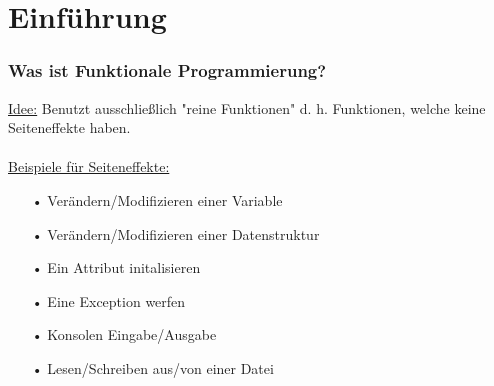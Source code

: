 	\section[Section]{Einführung}
		\begin{frame}
			\frametitle{Was ist Funktionale Programmierung?}
			\begin{flushleft}
				\underline{Idee:}
				Benutzt ausschließlich "reine Funktionen" d. h. Funktionen, welche 					keine Seiteneffekte haben. \\
				\leavevmode \\
				\underline{Beispiele für Seiteneffekte:}
				\begin{itemize}
				\item[•] Verändern/Modifizieren einer Variable
				\item[•] Verändern/Modifizieren einer Datenstruktur
				\item[•] Ein Attribut initalisieren
				\item[•] Eine Exception werfen
				\item[•] Konsolen Eingabe/Ausgabe
				\item[•] Lesen/Schreiben aus/von einer Datei
				\end{itemize}
			\end{flushleft}
		\end{frame}